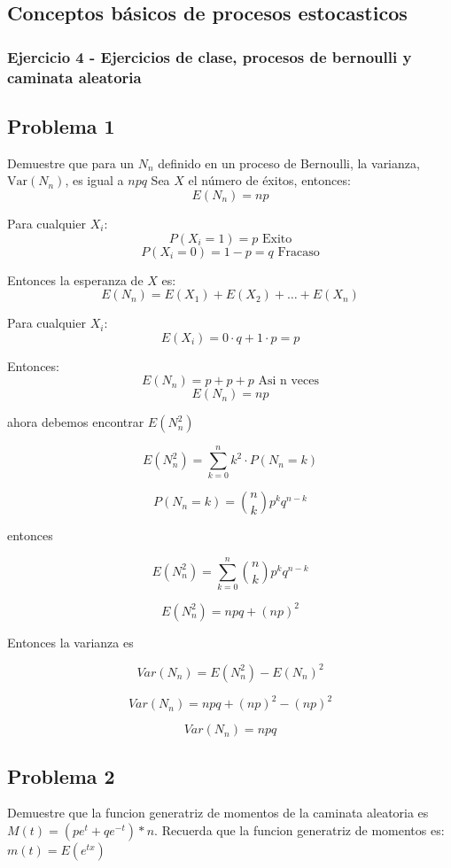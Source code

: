 \documentclass{article}
\begin{document}
\subsection{Conceptos básicos de procesos estocasticos}

\subsubsection{Ejercicio 4 - Ejercicios de clase, procesos de bernoulli y caminata aleatoria}

\subsection*{Problema 1}
Demuestre que para un $N_n$ definido en un proceso de Bernoulli, la varianza, $\text{Var}(N_n)$, es igual a $npq$
Sea \( X \) el número de éxitos, entonces:
\[ E(N_n) = np \]

Para cualquier \( X_i \):
\[ P(X_i = 1) = p \text{ Exito}\]
\[ P(X_i = 0) = 1 - p = q \text{ Fracaso}\]

Entonces la esperanza de \( X \) es:
\[ E(N_n) = E(X_1) + E(X_2) + \ldots + E(X_n) \]

Para cualquier \( X_i \):
\[ E(X_i) = 0 \cdot q + 1 \cdot p = p \]

Entonces:
\[ E(N_n) = p + p + p \text{ Asi n veces}\]
\[ E(N_n) = np\]

ahora debemos encontrar $E(N_n^2)$

\[E(N_n^2) = \sum_{k=0}^{n} k^2 \cdot P(N_n = k)\]

\[P(N_n = k) = \binom{n}{k} p^k q^{n-k}\]

entonces

\[E(N_n^2) = \sum_{k=0}^{n} \binom{n}{k} p^k q^{n-k}\]

\[E(N_n^2) = npq + (np)^2\]

Entonces la varianza es

\[Var(N_n) = E(N_n^2) - E(N_n)^2\]

\[Var(N_n) = npq + (np)^2 - (np)^2\]

\[Var(N_n) = npq\]

\subsection*{Problema 2}

Demuestre que la funcion generatriz de momentos de la caminata aleatoria es $M(t) = (pe^t + qe^{-t}) * n$. Recuerda que la funcion generatriz de momentos es: $m(t) = E(e^{tx})$
\end{document}
